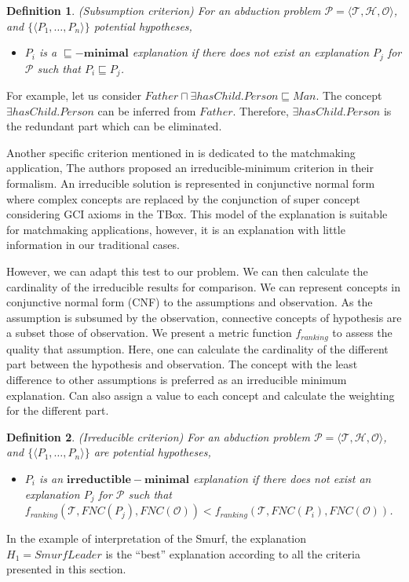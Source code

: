 \documentclass{article}
\newtheorem{mydef}{Definition}
\begin{document}
 \begin{mydef}{(Subsumption criterion)}
For an abduction problem $\mathcal{P}=\langle \mathcal{T},\mathcal{H}, \mathcal{O}\rangle$, and $\{\langle P_{1},\dots,P_{n}\rangle\}$ potential hypotheses,
\begin{itemize}
\item  $P_{i}$ is a $\bm{\sqsubseteq -minimal}$ explanation if there does not exist an explanation $P_{j}$ for $\mathcal{P}$ such that $P_{i}\sqsubseteq P_{j}$.
\end{itemize}
\end{mydef}
For example, let us consider $Father \sqcap \exists hasChild.Person \sqsubseteq Man$. The concept $\exists hasChild.Person$ can be inferred from $Father$.
Therefore, $\exists hasChild.Person$ is the redundant part which can be eliminated. 

Another specific criterion mentioned in \cite{di2007semantic} is dedicated to the matchmaking application,
The authors proposed an irreducible-minimum criterion in their formalism.
An irreducible solution is represented in conjunctive normal form where complex concepts are replaced by the conjunction of super concept
considering GCI axioms in the TBox.
This model of the explanation is suitable for matchmaking applications, however, it is an explanation with little information in our traditional cases.

However, we can adapt this test to our problem. We can then calculate the cardinality of the irreducible results for comparison.
We can represent concepts in conjunctive normal form (CNF) to the assumptions and observation. As the assumption is subsumed by the observation, connective concepts of hypothesis are a subset
those of observation. We present a metric function $ f_{ranking}$  to assess the quality that assumption. Here, one can calculate the cardinality of the different part
between the hypothesis and observation. The concept with the least difference to other assumptions is preferred as an irreducible minimum explanation. Can also
assign a value to each concept and calculate the weighting for the different part.

\begin{mydef}{(Irreducible criterion)}
For an abduction problem $\mathcal{P}=\langle \mathcal{T},\mathcal{H}, \mathcal{O}\rangle$, and $\{\langle P_{1},\dots,P_{n}\rangle\}$ are potential hypotheses,
\begin{itemize}
\item  $P_{i}$ is an $\bm{irreductible-minimal}$ explanation if there does not exist an explanation $P_{j}$ for $\mathcal{P}$ such that $f_{ranking}(\mathcal{T},FNC(P_{j}),FNC(\mathcal{O})) 
< f_{ranking}(\mathcal{T},FNC(P_{i}),FNC(\mathcal{O}))$.
\end{itemize}
\end{mydef}
In the example of interpretation of the Smurf, the explanation $H_1=SmurfLeader$ is the ``best'' explanation according to all the criteria presented
in this section.
\end{document}
